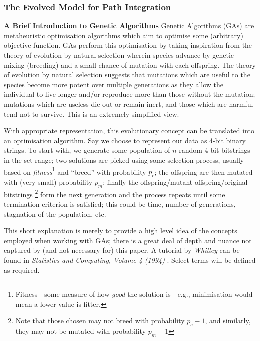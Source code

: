 \documentclass[a4paper,11pt,twoside,openright]{article}
\begin{document}
\subsubsection{The Evolved Model for Path Integration}
\textbf{A Brief Introduction to Genetic Algorithms}\newline
Genetic Algorithms (GAs) are metaheuristic
optimisation algorithms which aim to optimise some (arbitrary) objective
function. GAs perform this optimisation by taking inspiration from the
theory of evolution by natural selection wherein species advance by genetic
mixing (breeding) and a small chance of mutation with each offspring.
The theory of evolution by natural selection suggests that mutations
which are useful to the species become more potent over multiple generations
as they allow the individual to live longer and/or reproduce more than those
without the mutation; mutations which are useless die out or remain inert, and
those which are harmful tend not to survive. This is an extremely simplified
view.
\newline
\par

With appropriate representation, this evolutionary concept can be
translated into an optimisation algorithm. Say we choose to represent our data as
4-bit binary strings. To start with, we generate some population of $n$ random
4-bit bitstrings in the set range; two solutions are picked using some selection
process, usually based on \textit{fitness}\footnote{Fitness - some measure of how
  \textit{good} the solution is - e.g., minimisation would mean a lower value is
  fitter.} and ``breed'' with probability $p_c$; the offspring are then mutated
with (very small) probability $p_m$; finally the
offspring/mutant-offspring/original bitstrings \footnote{Note that those chosen
  may not breed with probability $p_c - 1$, and
similarly, they may not be mutated with probability $p_m - 1$} form the next
generation and the process repeats until some termination criterion is satisfied;
this could be time, number of generations, stagnation of the population, etc.
\newline
\par

This short explanation is merely to provide a high level idea of the concepts
employed when working with GAs; there is a great deal of depth and nuance
not captured by (and not necessary for) this paper. A tutorial by
\textit{Whitley} can be found in \textit{Statistics and Computing, Volume 4
  (1994)} \cite{Whitley1994}. Select terms will be defined as required.
\end{document}
